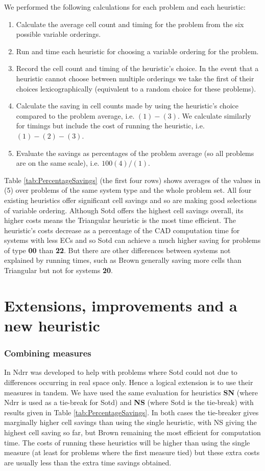 \documentclass[runningheads,a4paper]{llncs}
\begin{document}
We performed the following calculations for each problem and each heuristic:
\begin{enumerate}
\item Calculate the average cell count and timing for the problem from the six possible variable orderings.
\item Run and time each heuristic for choosing a variable ordering for the problem.
\item Record the cell count and timing of the heuristic's choice.  In the event that a heuristic cannot choose between multiple orderings we take the first of their choices lexicographically (equivalent to a random choice for these problems).  
\item Calculate the saving in cell counts made by using the heuristic's choice compared to the problem average, i.e. $(1) - (3)$.  
We calculate similarly for timings but include the cost of running the heuristic, i.e. $(1) - (2) - (3)$.
\item Evaluate the savings as percentages of the problem average (so all problems are on the same scale), i.e. $100(4)/(1)$.
\end{enumerate}
Table \ref{tab:PercentageSavings} (the first four rows) shows averages of the values in (5) over problems of the same system type and the whole problem set.  All four existing heuristics offer significant cell savings and so are making good selections of variable ordering.  Although Sotd offers the highest cell savings overall, its higher costs means the Triangular heuristic is the most time efficient.
The heuristic's costs decrease as a percentage of the CAD computation time for systems with less ECs and so Sotd can achieve a much higher saving for problems of type \textbf{00} than \textbf{22}.  But there are other differences between systems not explained by running times, such as Brown generally saving more cells than Triangular but not for systems \textbf{20}.

\section{Extensions, improvements and a new heuristic}
\label{SEC:New}

\subsubsection*{Combining measures}

In \cite{BDEW13} Ndrr was developed to help with problems where Sotd could not due to differences occurring in real space only.  Hence a logical extension is to use their measures in tandem.  We have used the same evaluation for heuristics \textbf{SN} (where Ndrr is used as a tie-break for Sotd) and \textbf{NS} (where Sotd is the tie-break) with results given in Table \ref{tab:PercentageSavings}.
In both cases the tie-breaker gives marginally higher cell savings than using the single heuristic, with NS giving the highest cell saving so far, but Brown remaining the most efficient for computation time.  The costs of running these heuristics will be higher than using the single measure (at least for problems where the first measure tied) but these extra costs are usually less than the extra time savings obtained.
\end{document}
